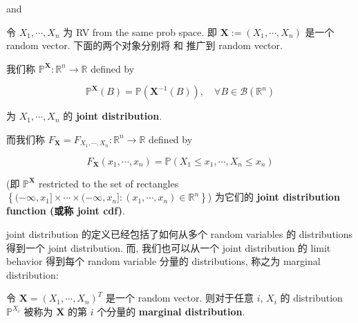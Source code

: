 \begin{definition}{ and }

令 \(\mathit{X}_{1},\cdots,\mathit{X}_{\mathit{n}}\) 为 RV from the same prob space. 即 \(\mathbf{X} := (\mathit{X}_{1},\cdots,\mathit{X}_{\mathit{n}})\) 是一个 random vector. 下面的两个对象分别将  和  推广到 random vector.

我们称 \(\mathbb{P}^{\mathbf{X}}:\mathbb{R}^{\mathit{n}}\rightarrow\mathbb{R}\) defined by

\[\mathbb{P}^{\mathbf{X}}(\mathit{B}) = \mathbb{P}(\mathbf{X}^{- 1}(\mathit{B})),\quad\forall\mathit{B} \in \mathcal{B}(\mathbb{R}^{\mathit{n}})\]

为 \(\mathit{X}_{1},\cdots,\mathit{X}_{\mathit{n}}\) 的 \textbf{joint distribution}.

而我们称 \(\mathit{F}_{\mathbf{X}} = \mathit{F}_{\mathit{X}_{1},\cdots,\mathit{X}_{\mathit{n}}}:\mathbb{R}^{\mathit{n}}\rightarrow\mathbb{R}\) defined by

\[\mathit{F}_{\mathbf{X}}(\mathit{x}_{1},\cdots,\mathit{x}_{\mathit{n}}) = \mathbb{P}(\mathit{X}_{1} \leq \mathit{x}_{1},\cdots,\mathit{X}_{\mathit{n}} \leq \mathit{x}_{\mathit{n}})\]

(即 \(\mathbb{P}^{\mathbf{X}}\) restricted to the set of rectangles \(\left\{ {( - \infty,\mathit{x}_{1}\rbrack \times \cdots \times ( - \infty,\mathit{x}_{\mathit{n}}\rbrack:(\mathit{x}_{1},\cdots,\mathit{x}_{\mathit{n}}) \in \mathbb{R}^{\mathit{n}}} \right\}\)) 为它们的 \textbf{joint distribution function (或称 joint cdf)}.

\end{definition}

joint distribution 的定义已经包括了如何从多个 random variables 的 distributions 得到一个 joint distribution. 而, 我们也可以从一个 joint distribution 的 limit behavior 得到每个 random variable 分量的 distributions, 称之为 marginal distribution:

\begin{definition}{}

令 \(\mathbf{X} = (\mathit{X}_{1},\cdots,\mathit{X}_{\mathit{n}})^{\mathit{T}}\) 是一个 random vector. 则对于任意 \(\mathit{i}\), \(\mathit{X}_{\mathit{i}}\) 的 distribution \(\mathbb{P}^{\mathit{X}_{\mathit{i}}}\) 被称为 \(\mathbf{X}\) 的第 \(\mathit{i}\) 个分量的 \textbf{marginal distribution}.

\end{definition}

